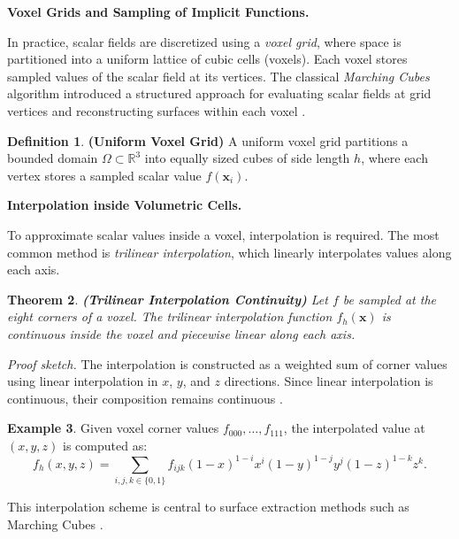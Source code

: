 \documentclass[12pt, a4paper, oneside]{book}
\theoremstyle{plain}
\newtheorem{theorem}{Theorem}[chapter]
\theoremstyle{definition}
\newtheorem{definition}[theorem]{Definition}
\newtheorem{example}[theorem]{Example}
\theoremstyle{remark}
\theoremstyle{definition}
\begin{document}
\vspace{0.5em}

\textbf{Voxel Grids and Sampling of Implicit Functions.}

In practice, scalar fields are discretized using a \emph{voxel grid}, where space is partitioned into a uniform lattice of cubic cells (voxels). Each voxel stores sampled values of the scalar field at its vertices. The classical \emph{Marching Cubes} algorithm introduced a structured approach for evaluating scalar fields at grid vertices and reconstructing surfaces within each voxel \cite{lorensen1998marching}.
\begin{definition}
    \textbf{(Uniform Voxel Grid)}
A uniform voxel grid partitions a bounded domain $\Omega \subset \mathbb{R}^3$ into equally sized cubes of side length $h$, where each vertex stores a sampled scalar value $f(\mathbf{x}_i)$.

\end{definition}

\vspace{0.5em}

\textbf{Interpolation inside Volumetric Cells.}

To approximate scalar values inside a voxel, interpolation is required. The most common method is \emph{trilinear interpolation}, which linearly interpolates values along each axis.

\begin{theorem}
    \textbf{(Trilinear Interpolation Continuity)}
Let $f$ be sampled at the eight corners of a voxel. The trilinear interpolation function $f_h(\mathbf{x})$ is continuous inside the voxel and piecewise linear along each axis.
\end{theorem}


\textit{Proof sketch.} The interpolation is constructed as a weighted sum of corner values using linear interpolation in $x$, $y$, and $z$ directions. Since linear interpolation is continuous, their composition remains continuous \cite{lorensen1998marching}.

\begin{example}
    Given voxel corner values $f_{000}, \dots, f_{111}$, the interpolated value at $(x,y,z)$ is computed as:
\[
f_h(x,y,z) = \sum_{i,j,k \in \{0,1\}} f_{ijk}(1-x)^{1-i}x^i(1-y)^{1-j}y^j(1-z)^{1-k}z^k.
\]
\end{example}


This interpolation scheme is central to surface extraction methods such as Marching Cubes \cite{lorensen1998marching}.
\end{document}
